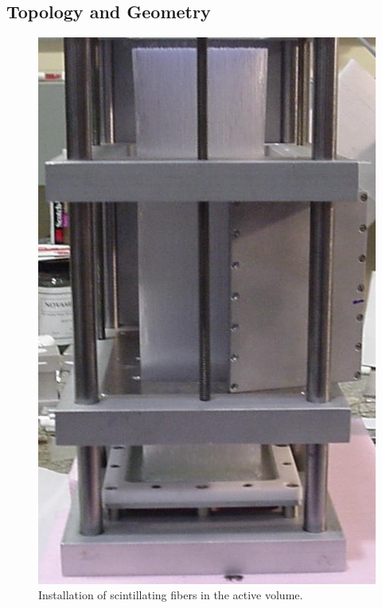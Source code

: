 \subsection{Topology and Geometry}

\begin{figure}[h]
\centering
\includegraphics[width=0.65\linewidth]{images/Fig4_InstallFibers_Crop.jpg} 
    \caption{Installation of scintillating fibers in the active volume.} 
    \label{fig:InstallFibers}
\end{figure}

